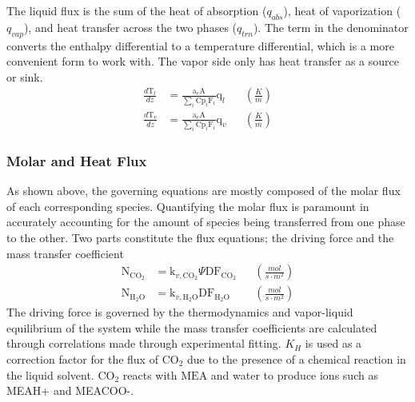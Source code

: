 \documentclass[12pt, letterpaper]{article}
\begin{document}
            The liquid flux is the sum of the heat of absorption ($q_{abs}$), heat of vaporization ($q_{vap}$), and heat transfer across the two phases ($q_{trn}$). The term in the denominator converts the enthalpy differential to a temperature differential, which is a more convenient form to work with.
            The vapor side only has heat transfer as a source or sink.
            \begin{align}
                \frac{d \mathrm{T}_l}{d z} &=\frac{\mathrm{a}_e \mathrm{A}}{\sum_i \mathrm{Cp}_i \mathrm{F}_i} \mathrm{q}_l && \left(\frac{\unit{K}}{\unit{m}} \right)\\
                \frac{d \mathrm{T}_v}{d z} &=\frac{\mathrm{a}_e \mathrm{A}}{\sum_i \mathrm{Cp}_i \mathrm{F}_i} \mathrm{q}_v && \left(\frac{\unit{K}}{\unit{m}} \right)
            \end{align}
    
            \subsubsection{Molar and Heat Flux}
                As shown above, the governing equations are mostly composed of the molar flux of each corresponding species.
                Quantifying the molar flux is paramount in accurately accounting for the amount of species being transferred from one phase to the other.
                Two parts constitute the flux equations; the driving force and the mass transfer coefficient
                \begin{align}
                    \mathrm{N}_{\mathrm{CO}_2} &= \mathrm{k}_{v, \mathrm{CO}_2}\Psi \mathrm{DF}_{\mathrm{CO}_2} && \left(\frac{\unit{mol}}{\unit{s\cdot m^2}} \right) \\
                    \mathrm{N}_{\mathrm{H_{2}O}} &= \mathrm{k}_{v, \mathrm{H_{2}O}} \mathrm{DF}_{\mathrm{H_{2}O}} && \left(\frac{\unit{mol}}{\unit{s\cdot m^2}} \right)
                \end{align}
                The driving force is governed by the thermodynamics and vapor-liquid equilibrium of the system while the mass transfer coefficients are calculated through correlations made through experimental fitting. $K_H$ is used as a correction factor for the flux of $\mathrm{CO}_2$ due to the presence of a chemical reaction in the liquid solvent.
                $\mathrm{CO}_2$ reacts with $\mathrm{MEA}$ and water to produce ions such as MEAH+ and MEACOO-.
                
\end{document}
